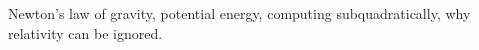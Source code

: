 \documentclass[../main.tex]{subfiles}
\begin{document}
Newton's law of gravity, potential energy, computing subquadratically, why relativity can be
ignored.
\end{document}
